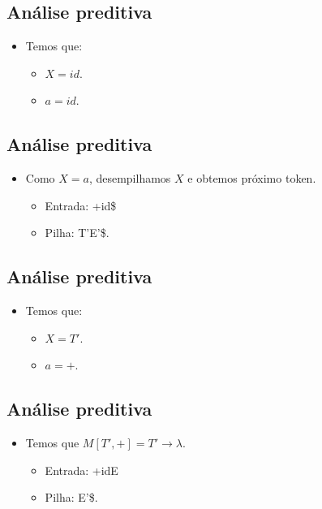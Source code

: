 \documentclass[11pt]{article}
\begin{document}
\subsection*{Análise preditiva}
\label{sec:org662595d}

\begin{itemize}
\item Temos que:
\begin{itemize}
\item \(X=id\).
\item \(a = id\).
\end{itemize}
\end{itemize}
\subsection*{Análise preditiva}
\label{sec:org5d91f77}

\begin{itemize}
\item Como \(X = a\), desempilhamos \(X\) e obtemos próximo token.
\begin{itemize}
\item Entrada: +id\$
\item Pilha: T'E'\$.
\end{itemize}
\end{itemize}
\subsection*{Análise preditiva}
\label{sec:org32a237e}

\begin{itemize}
\item Temos que:
\begin{itemize}
\item \(X = T'\).
\item \(a = +\).
\end{itemize}
\end{itemize}
\subsection*{Análise preditiva}
\label{sec:org7e11af7}

\begin{itemize}
\item Temos que \(M[T',+] = T'\to\lambda\).
\begin{itemize}
\item Entrada: +idE
\item Pilha: E'\$.
\end{itemize}
\end{itemize}
\end{document}

